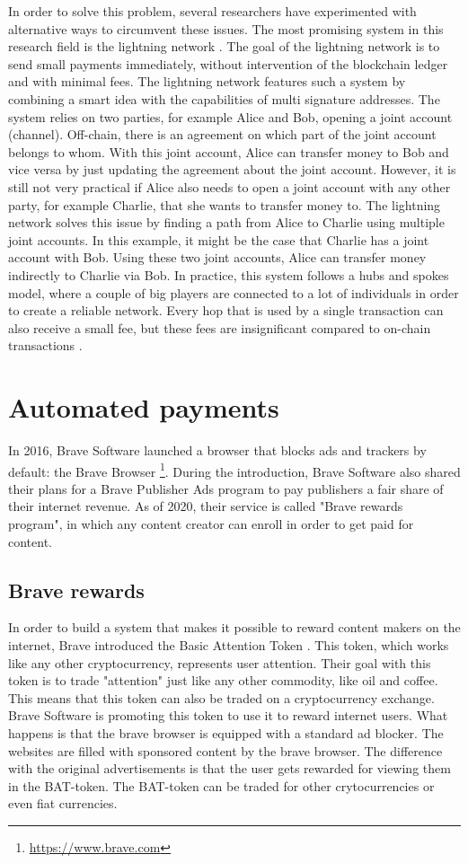 In order to solve this problem, several researchers have experimented with alternative ways to circumvent these issues. The most promising system in this research field is the lightning network \cite{poon2016bitcoin}. The goal of the lightning network is to send small payments immediately, without intervention of the blockchain ledger and with minimal fees. The lightning network features such a system by combining a smart idea with the capabilities of multi signature addresses. The system relies on two parties, for example Alice and Bob, opening a joint account (channel). Off-chain, there is an agreement on which part of the joint account belongs to whom. With this joint account, Alice can transfer money to Bob and vice versa by just updating the agreement about the joint account. However, it is still not very practical if Alice also needs to open a joint account with any other party, for example Charlie, that she wants to transfer money to. The lightning network solves this issue by finding a path from Alice to Charlie using multiple joint accounts. In this example, it might be the case that Charlie has a joint account with Bob. Using these two joint accounts, Alice can transfer money indirectly to Charlie via Bob. In practice, this system follows a hubs and spokes model, where a couple of big players are connected to a lot of individuals in order to create a reliable network. Every hop that is used by a single transaction can also receive a small fee, but these fees are insignificant compared to on-chain transactions \cite{poon2016bitcoin}.


\section{Automated payments}
In 2016, Brave Software launched a browser that blocks ads and trackers by default: the Brave Browser \footnote{\url{https://www.brave.com}}. During the introduction, Brave Software also shared their plans for a Brave Publisher Ads program to pay publishers a fair share of their internet revenue. As of 2020, their service is called "Brave rewards program", in which any content creator can enroll in order to get paid for content. 

\subsection{Brave rewards} 
In order to build a system that makes it possible to reward content makers on the internet, Brave introduced the Basic Attention Token \cite{token2018blockchain}. This token, which works like any other cryptocurrency, represents user attention. Their goal with this token is to trade "attention" just like any other commodity, like oil and coffee. This means that this token can also be traded on a cryptocurrency exchange. Brave Software is promoting this token to use it to reward internet users. What happens is that the brave browser is equipped with a standard ad blocker. The websites are filled with sponsored content by the brave browser. The difference with the original advertisements is that the user gets rewarded for viewing them in the BAT-token. The BAT-token can be traded for other crytocurrencies or even fiat currencies. 

